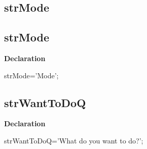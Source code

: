 \documentclass{report}
\newif\ifpdf
\begin{document}
\subsection*{\large{\textbf{strMode}}\normalsize\hspace{1ex}\hrulefill}
\else
\subsection*{strMode}
\fi
\label{trstrings-strMode}
\begin{list}{}{
\setlength{\itemindent}{0cm}
\setlength{\listparindent}{0cm}
\setlength{\leftmargin}{\evensidemargin}
\addtolength{\leftmargin}{\tmplength}
\settowidth{\labelsep}{X}
\addtolength{\leftmargin}{\labelsep}
\setlength{\labelwidth}{\tmplength}
}
\item[\textbf{Declaration}\hfill]
\ifpdf
\begin{flushleft}
\fi
\begin{ttfamily}
strMode='Mode';\end{ttfamily}

\ifpdf
\end{flushleft}
\fi

\end{list}
\ifpdf
\subsection*{\large{\textbf{strWantToDoQ}}\normalsize\hspace{1ex}\hrulefill}
\else
\subsection*{strWantToDoQ}
\fi
\label{trstrings-strWantToDoQ}
\begin{list}{}{
\setlength{\itemindent}{0cm}
\setlength{\listparindent}{0cm}
\setlength{\leftmargin}{\evensidemargin}
\addtolength{\leftmargin}{\tmplength}
\settowidth{\labelsep}{X}
\addtolength{\leftmargin}{\labelsep}
\setlength{\labelwidth}{\tmplength}
}
\item[\textbf{Declaration}\hfill]
\ifpdf
\begin{flushleft}
\fi
\begin{ttfamily}
strWantToDoQ='What do you want to do?';\end{ttfamily}

\ifpdf
\end{flushleft}
\fi

\end{list}
\ifpdf
\end{document}

